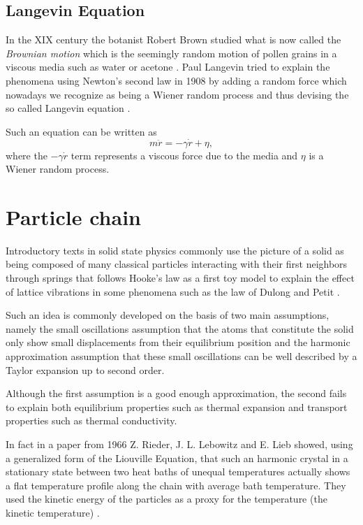 \subsection{Langevin Equation}

In the XIX century the botanist Robert Brown studied what is now called the \textit{Brownian motion} which is the seemingly random motion of pollen grains in a viscous media such as water or acetone \cite{nelsonDynamicalTheories2001}. Paul Langevin tried to explain the phenomena using Newton's second law in 1908 by adding a random force which nowadays we recognize as being a Wiener random process and thus devising the so called Langevin equation \cite{lemonsPaulLangevin1997}.

Such an equation can be written as
\[ m\ddot{r} = -\gamma \dot{r} + \eta,\]
where the $ -\gamma \dot{r} $ term represents a viscous force due to the media and $ \eta $ is a Wiener random process.


\section{Particle chain}

Introductory texts in solid state physics commonly use the picture of a solid as being composed of many classical particles interacting with their first neighbors through springs that follows Hooke's law as a first toy model to explain the effect of lattice vibrations in some phenomena such as the law of Dulong and Petit \cite{ashcroftSolidState1976}.

Such an idea is commonly developed on the basis of two main assumptions, namely the small oscillations assumption that the atoms that constitute the solid only show small displacements from their equilibrium position and the harmonic approximation assumption that these small oscillations can be well described by a Taylor expansion up to second order.

Although the first assumption is a good enough approximation, the second fails to explain both equilibrium properties such as thermal expansion and transport properties such as thermal conductivity.

In fact in a paper from 1966 Z. Rieder, J. L. Lebowitz and E. Lieb showed, using a generalized form of the Liouville Equation, that such an harmonic crystal in a stationary state between two heat baths of unequal temperatures actually shows a flat temperature profile along the chain with average bath temperature. They used the kinetic energy of the particles as a proxy for the temperature (the kinetic temperature) \cite{riederPropertiesHarmonic1967}.



